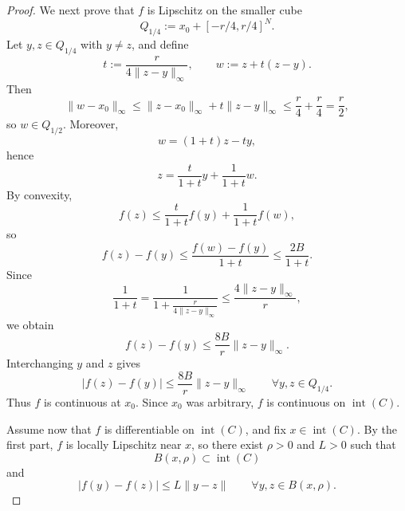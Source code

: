 \documentclass[reqno]{amsart}
\theoremstyle{definition}
\begin{document}
\begin{proof}
We next prove that $f$ is Lipschitz on the smaller cube
\begin{equation}
    Q_{1/4}:=x_0+[-r/4,r/4]^N.
\end{equation}
Let $y,z \in Q_{1/4}$ with $y \neq z$, and define
\begin{equation}
    t:=\frac{r}{4\|z-y\|_\infty},
    \qquad
    w:=z+t(z-y).
\end{equation}
Then
\begin{equation}
    \|w-x_0\|_\infty
    \leq \|z-x_0\|_\infty+t\|z-y\|_\infty
    \leq \frac{r}{4}+\frac{r}{4}=\frac{r}{2},
\end{equation}
so $w \in Q_{1/2}$. Moreover,
\begin{equation}
    w=(1+t)z-ty,
\end{equation}
hence
\begin{equation}
    z=\frac{t}{1+t}y+\frac{1}{1+t}w.
\end{equation}
By convexity,
\begin{equation}
    f(z) \leq \frac{t}{1+t}f(y)+\frac{1}{1+t}f(w),
\end{equation}
so
\begin{equation}
    f(z)-f(y) \leq \frac{f(w)-f(y)}{1+t} \leq \frac{2B}{1+t}.
\end{equation}
Since
\begin{equation}
    \frac{1}{1+t}
    =\frac{1}{1+\frac{r}{4\|z-y\|_\infty}}
    \leq \frac{4\|z-y\|_\infty}{r},
\end{equation}
we obtain
\begin{equation}
    f(z)-f(y) \leq \frac{8B}{r}\|z-y\|_\infty.
\end{equation}
Interchanging $y$ and $z$ gives
\begin{equation}
    |f(z)-f(y)| \leq \frac{8B}{r}\|z-y\|_\infty
    \qquad \forall y,z \in Q_{1/4}.
\end{equation}
Thus $f$ is continuous at $x_0$. Since $x_0$ was arbitrary, $f$ is continuous
on $\operatorname{int}(C)$.

Assume now that $f$ is differentiable on $\operatorname{int}(C)$, and fix
$x \in \operatorname{int}(C)$. By the first part, $f$ is locally Lipschitz near
$x$, so there exist $\rho>0$ and $L>0$ such that
\begin{equation}
    B(x,\rho) \subset \operatorname{int}(C)
\end{equation}
and
\begin{equation}
    |f(y)-f(z)| \leq L\|y-z\|
    \qquad \forall y,z \in B(x,\rho).
\end{equation}


\end{proof}
\end{document}

